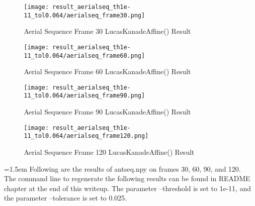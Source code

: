 \documentclass{article}
\begin{document}
	\begin{figure}[H]
	\centering
	\begin{minipage}[b]{0.45\textwidth}
		\centering
		\texttt{[image: result\_aerialseq\_th1e-11\_tol0.064/aerialseq\_frame30.png]}  %
		\caption{Aerial Sequence Frame 30 LucasKanadeAffine() Result}
		\label{fig:Q2_3_Aerial_frame_30_result}
	\end{minipage}
	\hfill  %
	\begin{minipage}[b]{0.45\textwidth}
		\centering
		\texttt{[image: result\_aerialseq\_th1e-11\_tol0.064/aerialseq\_frame60.png]}  %
		\caption{Aerial Sequence Frame 60 LucasKanadeAffine() Result}
		\label{fig:Q2_3_Aerial_frame_60_result}
	\end{minipage}	
	\end{figure}
	\begin{figure}[H]
	\centering
	\begin{minipage}[b]{0.45\textwidth}
		\centering
		\texttt{[image: result\_aerialseq\_th1e-11\_tol0.064/aerialseq\_frame90.png]}  %
		\caption{Aerial Sequence Frame 90 LucasKanadeAffine() Result}
		\label{fig:Q2_3_Aerial_frame_90_result}
	\end{minipage}
	\hfill  %
	\begin{minipage}[b]{0.45\textwidth}
		\centering
		\texttt{[image: result\_aerialseq\_th1e-11\_tol0.064/aerialseq\_frame120.png]}  %
		\caption{Aerial Sequence Frame 120 LucasKanadeAffine() Result}
		\label{fig:Q2_3_Aerial_frame_120_result}
	\end{minipage}	
	\end{figure}	
	
	\hangindent=1.5em \hspace{1.5em} Following are the results of antseq.npy on frames 30, 60, 90, and 120. The command line to regenerate the following results can be found in README chapter at the end of this writeup. The parameter --threshold is set to 1e-11, and the parameter --tolerance is set to 0.025.
	
\end{document}
